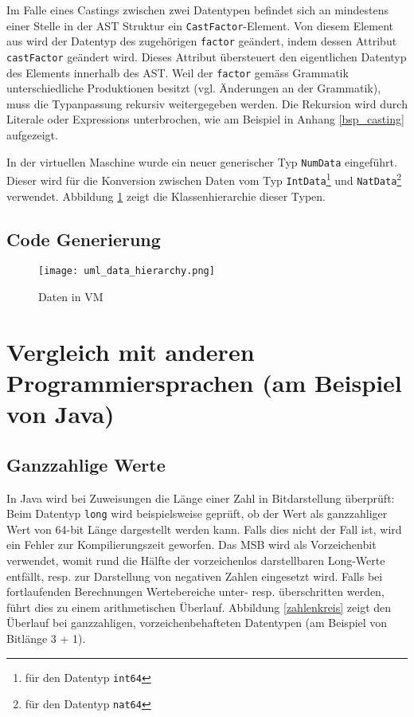 \documentclass[10pt, a4paper, twocolumn]{article} %
\begin{document}
Im Falle eines Castings zwischen zwei Datentypen befindet sich an mindestens einer Stelle in der AST Struktur ein \texttt{CastFactor}-Element.
Von diesem Element aus wird der Datentyp des zugehörigen \texttt{factor} geändert, indem dessen Attribut \texttt{castFactor} geändert wird.
Dieses Attribut übersteuert den eigentlichen Datentyp des Elements innerhalb des AST.
Weil der \texttt{factor} gemäss Grammatik unterschiedliche Produktionen besitzt (vgl. Änderungen an der Grammatik), muss die Typanpassung rekursiv weitergegeben werden.
Die Rekursion wird durch Literale oder Expressions unterbrochen, wie am Beispiel in Anhang \ref{bsp_casting} aufgezeigt.

In der virtuellen Maschine wurde ein neuer generischer Typ \texttt{NumData} eingeführt.
Dieser wird für die Konversion zwischen Daten vom Typ \texttt{IntData}\footnote{für den Datentyp \texttt{int64}} und \texttt{NatData}\footnote{für den Datentyp \texttt{nat64}} verwendet.
Abbildung \ref{data_hierarchy} zeigt die Klassenhierarchie dieser Typen.

\subsection{Code Generierung}

\begin{figure}[H]
    \texttt{[image: uml\_data\_hierarchy.png]} %
    \caption{Daten in VM} %
    \label{data_hierarchy}
\end{figure}

\section{Vergleich mit anderen Programmiersprachen (am Beispiel von Java)}
\subsection{Ganzzahlige Werte}
In Java wird bei Zuweisungen die Länge einer Zahl in Bitdarstellung überprüft:
Beim Datentyp \texttt{long} wird beispielsweise geprüft, ob der Wert als ganzzahliger Wert von 64-bit Länge dargestellt werden kann.
Falls dies nicht der Fall ist, wird ein Fehler zur Kompilierungszeit geworfen.
Das MSB wird als Vorzeichenbit verwendet, womit rund die Hälfte der vorzeichenlos darstellbaren Long-Werte entfällt, resp. zur Darstellung von negativen Zahlen eingesetzt wird.
Falls bei fortlaufenden Berechnungen Wertebereiche unter- resp. überschritten werden, führt dies zu einem arithmetischen Überlauf.
Abbildung \ref{zahlenkreis} %
zeigt den Überlauf bei ganzzahligen, vorzeichenbehafteten Datentypen (am Beispiel von Bitlänge 3 + 1).
\end{document}
